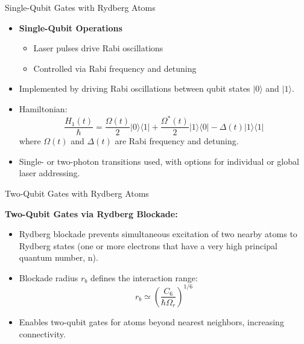 \documentclass{beamer}
\begin{document}
\begin{frame}{Single-Qubit Gates with Rydberg Atoms}
  \begin{itemize}
    \item \textbf{Single-Qubit Operations}
      \begin{itemize}
        \item Laser pulses drive Rabi oscillations
        \item Controlled via Rabi frequency and detuning
      \end{itemize}
  \end{itemize}
  \begin{itemize}
        \item Implemented by driving Rabi oscillations between qubit states \( |0\rangle \) and \( |1\rangle \).
        \item Hamiltonian: 
        \[
            \frac{H_1(t)}{\hbar} = \frac{\Omega(t)}{2} |0\rangle\langle 1| + \frac{\Omega^*(t)}{2} |1\rangle\langle 0| - \Delta(t) |1\rangle\langle 1|
        \]
        where \( \Omega(t) \) and \( \Delta(t) \) are Rabi frequency and detuning.
        \item Single- or two-photon transitions used, with options for individual or global laser addressing.
    \end{itemize}
\end{frame}
\begin{frame}{Two-Qubit Gates with Rydberg Atoms}
    
    \vspace{0.5cm}
    \textbf{Two-Qubit Gates via Rydberg Blockade:}
    \begin{itemize}
        \item Rydberg blockade prevents simultaneous excitation of two nearby atoms to Rydberg states (one or more electrons that have a very high principal quantum number, n).
        \item Blockade radius \( r_b \) defines the interaction range:
        \[
            r_b \simeq \left( \frac{C_6}{\hbar \Omega_r} \right)^{1/6}
        \]
        \item Enables two-qubit gates for atoms beyond nearest neighbors, increasing connectivity.
    \end{itemize}
\end{frame}
\end{document}
